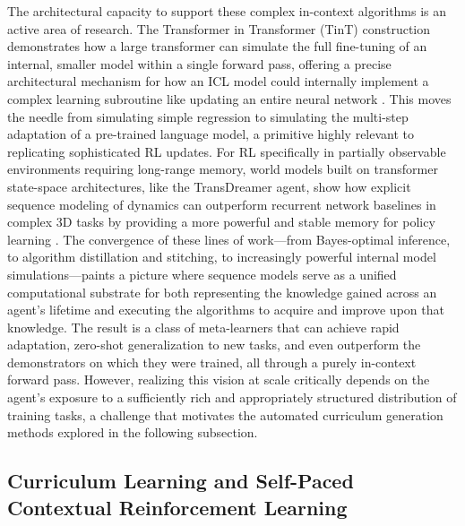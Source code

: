 \documentclass[11pt]{article}
\begin{document}
The architectural capacity to support these complex in-context algorithms is an active area of research. The Transformer in Transformer (TinT) construction demonstrates how a large transformer can simulate the full fine-tuning of an internal, smaller model within a single forward pass, offering a precise architectural mechanism for how an ICL model could internally implement a complex learning subroutine like updating an entire neural network \cite{ref368}. This moves the needle from simulating simple regression to simulating the multi-step adaptation of a pre-trained language model, a primitive highly relevant to replicating sophisticated RL updates. For RL specifically in partially observable environments requiring long-range memory, world models built on transformer state-space architectures, like the TransDreamer agent, show how explicit sequence modeling of dynamics can outperform recurrent network baselines in complex 3D tasks by providing a more powerful and stable memory for policy learning \cite{ref369}. The convergence of these lines of work---from Bayes-optimal inference, to algorithm distillation and stitching, to increasingly powerful internal model simulations---paints a picture where sequence models serve as a unified computational substrate for both representing the knowledge gained across an agent's lifetime and executing the algorithms to acquire and improve upon that knowledge. The result is a class of meta-learners that can achieve rapid adaptation, zero-shot generalization to new tasks, and even outperform the demonstrators on which they were trained, all through a purely in-context forward pass. However, realizing this vision at scale critically depends on the agent's exposure to a sufficiently rich and appropriately structured distribution of training tasks, a challenge that motivates the automated curriculum generation methods explored in the following subsection.

\subsection{Curriculum Learning and Self-Paced Contextual Reinforcement Learning}
\end{document}
